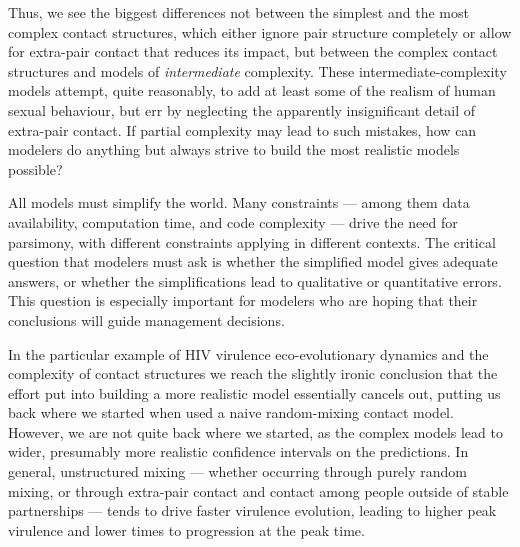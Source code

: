 \documentclass[10pt,letterpaper]{article}
\begin{document}
Thus, we see the biggest differences not between the simplest
and the most complex contact structures, which either
ignore pair structure completely or allow for extra-pair
contact that reduces its impact, but between the
complex contact structures and models of \emph{intermediate}
complexity. These intermediate-complexity models attempt,
quite reasonably, to add at least some of the realism of
human sexual behaviour, but err by neglecting the apparently insignificant
detail of extra-pair contact. If partial complexity
may lead to such mistakes, how can modelers do anything but always
strive to build the most realistic models possible?

All models must simplify the world.  Many constraints --- among them data
availability, computation time, and code complexity --- drive the need
for parsimony, with different constraints applying in different
contexts. The critical question that modelers must ask is whether the
simplified model gives adequate answers, or whether the
simplifications lead to qualitative or quantitative errors.
This question is especially important for modelers who
are hoping that their conclusions will guide management decisions.

In the particular example of HIV virulence eco-evolutionary dynamics
and the complexity of contact structures
we reach the slightly ironic conclusion that the
effort put into building a more realistic model essentially cancels
out, putting us back where we started when used a naive random-mixing
contact model.
However, we are not quite back where we started, as the
complex models lead to wider, presumably more realistic
confidence intervals on the predictions.
In general, unstructured mixing --- whether occurring through 
purely random mixing, or through extra-pair contact and contact
among people outside of stable partnerships --- tends to drive
faster virulence evolution, leading to higher peak virulence and 
lower times to progression at the peak time.
\end{document}
